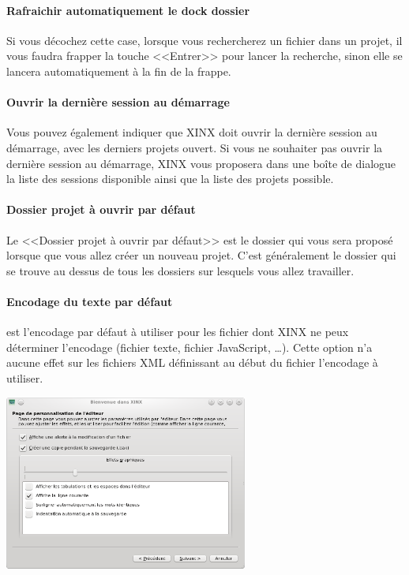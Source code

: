 \documentclass[a4paper,10pt,twoside]{book}
\begin{document}
\paragraph{Rafraichir automatiquement le dock dossier} Si vous décochez cette case, lorsque vous rechercherez un fichier dans un projet, il vous faudra frapper la touche <<Entrer>> pour lancer la recherche, sinon elle se lancera automatiquement à la fin de la frappe.

\paragraph{Ouvrir la dernière session au démarrage} Vous pouvez également indiquer que XINX doit ouvrir la dernière session au démarrage, avec les derniers projets ouvert. Si vous ne souhaiter pas ouvrir la dernière session au démarrage, XINX vous proposera dans une boîte de dialogue la liste des sessions disponible ainsi que la liste des projets possible.

\paragraph{Dossier projet à ouvrir par défaut} Le <<Dossier projet à ouvrir par défaut>> est le dossier qui vous sera proposé lorsque que vous allez créer un nouveau projet. C'est généralement le dossier qui se trouve au dessus de tous les dossiers sur lesquels vous allez travailler.

\paragraph{Encodage du texte par défaut} est l'encodage par défaut à utiliser pour les fichier dont XINX ne peux déterminer l'encodage (fichier texte, fichier JavaScript, \dots). Cette option n'a aucune effet sur les fichiers XML définissant au début du fichier l'encodage à utiliser.

\begin{center}
 \includegraphics[width=0.60\textwidth]{./firstinstall3.png}
\end{center}
\end{document}
